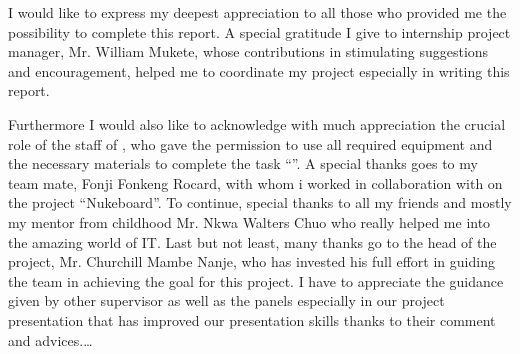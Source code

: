 \documentclass[
11pt, %
english, %
singlespacing, %
headsepline, %
]{InternshipReport} %
\begin{document}
\begin{acknowledgements}
\addchaptertocentry{\acknowledgementname} %

I would like to express my deepest appreciation to all those who provided me the possibility to complete this report. A special gratitude I give to internship project manager, Mr. William Mukete, whose contributions in stimulating suggestions and encouragement, helped me to coordinate my project especially in writing this report.

Furthermore I would also like to acknowledge with much appreciation the crucial role of the staff of {\facname}, who gave the permission to use all required equipment and the necessary materials to complete the  task \enquote{\ttitle}. A special thanks goes to my team mate, Fonji Fonkeng Rocard, with whom i worked in collaboration with on the project “Nukeboard”. To continue, special thanks to all my friends and mostly my mentor from childhood Mr. Nkwa Walters Chuo who really helped me into the amazing world of IT. Last but not least, many thanks go to the head of the project, Mr. Churchill Mambe Nanje, who has invested his full effort in guiding the team in achieving the goal for this project. I have to appreciate the guidance given by other supervisor as well as the panels especially in our project presentation that has improved our presentation skills thanks to their comment and advices.\ldots

\end{acknowledgements}


\tableofcontents %

\listoffigures %

\end{document}
